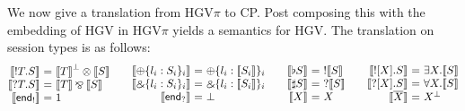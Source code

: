 \documentclass{easychair}
\makeatletter
\newcommand{\ba}{\begin{array}}
\newcommand{\ea}{\end{array}}
\newenvironment{eqs}{\ba{@{}r@{~}c@{~}l@{}}}{\ea}
\newcommand{\key}{\mathsf}
\newcommand{\set}[1]{\{ #1 \}}
\newcommand{\row}[2]{\set{#1}_{#2}}
\newcommand{\gvOutput}[2]{\mathord{!}{#1}.{#2}}
\newcommand{\gvInput}[2]{\mathord{?}{#1}.{#2}}
\newcommand{\gvEndOutput}{\key{end}_!}
\newcommand{\gvEndInput}{\key{end}_?}
\newcommand{\gvPlus}[2]{\oplus \row{#1}{#2}}
\newcommand{\gvChoice}[2]{\binampersand \row{#1}{#2}}
\newcommand{\gvServer}[1]{\flat {#1}}
\newcommand{\gvService}[1]{\sharp {#1}}
\newcommand{\gvDual}[1]{\overline{#1}}
\newcommand{\gvOutputType}[2]{![{#1}].{#2}}
\newcommand{\gvInputType}[2]{?[{#1}].{#2}}
\newcommand{\la}{l}
\newcommand{\cpTimes}[2]{{#1} \otimes {#2}}
\newcommand{\cpPar}[2]{{#1} \mathbin{\bindnasrepma} {#2}}
\newcommand{\cpPlus}[2]{\oplus \row{#1}{#2}}
\newcommand{\cpWith}[2]{\binampersand \row{#1}{#2}}
\newcommand{\cpOne}{1}
\newcommand{\cpBottom}{\bot}
\newcommand{\cpOfCourse}[1]{\mathord{!}{#1}}
\newcommand{\cpWhyNot}[1]{\mathord{?}{#1}}
\newcommand{\cpDual}[1]{{#1}^\bot}
\newcommand{\cpExists}[2]{\exists {#1}.{#2}}
\newcommand{\cpForall}[2]{\forall {#1}.{#2}}
\newcommand{\hgv}{HGV\xspace}
\newcommand{\hgvpi}{HGV$\pi$\xspace}
\newcommand{\hgvcp}[1]{\llbracket{#1}\rrbracket}
\makeatother
\begin{document}
We now give a translation from \hgvpi to CP. Post composing this with the embedding of \hgv in
\hgvpi yields a semantics for \hgv.
%
The translation on session types is as follows:
\[
\ba{@{}c@{\qquad}c@{\qquad}c@{\qquad}c@{}}
\begin{eqs}
\hgvcp{\gvOutput{T}{S}}         &=& \cpTimes{\cpDual{\hgvcp{T}}}{\hgvcp{S}} \\
\hgvcp{\gvInput{T}{S}}          &=& \cpPar{\hgvcp{T}}{\hgvcp{S}} \\
\hgvcp{\gvEndOutput}  &=& \cpOne \\
\end{eqs}
&
\begin{eqs}
\hgvcp{\gvPlus{\la_i:S_i}{i}}   &=& \cpPlus{\la_i:\hgvcp{S_i}}{i} \\
\hgvcp{\gvChoice{\la_i:S_i}{i}} &=& \cpWith{\la_i:\hgvcp{S_i}}{i} \\
\hgvcp{\gvEndInput}   &=& \cpBottom \\
\end{eqs}
&
\begin{eqs}
\hgvcp{\gvServer{S}}  &=& \cpOfCourse{\hgvcp{S}} \\
\hgvcp{\gvService{S}} &=& \cpWhyNot{\hgvcp{S}} \\
\hgvcp{X}                   &=& X \\
\end{eqs}
&
\begin{eqs}
\hgvcp{\gvOutputType{X}{S}} &=& \cpExists{X}{\hgvcp{S}} \\
\hgvcp{\gvInputType{X}{S}}  &=& \cpForall{X}{\hgvcp{S}} \\
\hgvcp{\gvDual{X}}          &=& \cpDual{X} \\
\end{eqs}
\ea
\]
\end{document}
